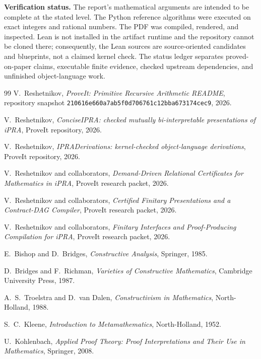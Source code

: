 \documentclass[11pt,oneside]{article}
\theoremstyle{remark}
\begin{document}
\vspace{0.4em}
\noindent\textbf{Verification status.}
The report's mathematical arguments are intended to be complete at the stated level.  The Python reference algorithms were executed on exact integers and rational numbers.  The PDF was compiled, rendered, and inspected.  Lean is not installed in the artifact runtime and the repository cannot be cloned there; consequently, the Lean sources are source-oriented candidates and blueprints, not a claimed kernel check.  The status ledger separates proved-on-paper claims, executable finite evidence, checked upstream dependencies, and unfinished object-language work.

\tableofcontents
\newpage
















\begin{thebibliography}{99}
V.~Reshetnikov, \emph{ProveIt: Primitive Recursive Arithmetic README}, repository snapshot \texttt{210616e660a7ab5f0d706761c12bba673174cec9}, 2026.

V.~Reshetnikov, \emph{ConciseIPRA: checked mutually bi-interpretable presentations of iPRA}, ProveIt repository, 2026.

V.~Reshetnikov, \emph{IPRADerivations: kernel-checked object-language derivations}, ProveIt repository, 2026.

V.~Reshetnikov and collaborators, \emph{Demand-Driven Relational Certificates for Mathematics in iPRA}, ProveIt research packet, 2026.

V.~Reshetnikov and collaborators, \emph{Certified Finitary Presentations and a Contract-DAG Compiler}, ProveIt research packet, 2026.

V.~Reshetnikov and collaborators, \emph{Finitary Interfaces and Proof-Producing Compilation for iPRA}, ProveIt research packet, 2026.

E.~Bishop and D.~Bridges, \emph{Constructive Analysis}, Springer, 1985.

D.~Bridges and F.~Richman, \emph{Varieties of Constructive Mathematics}, Cambridge University Press, 1987.

A.~S.~Troelstra and D.~van Dalen, \emph{Constructivism in Mathematics}, North-Holland, 1988.

S.~C.~Kleene, \emph{Introduction to Metamathematics}, North-Holland, 1952.

U.~Kohlenbach, \emph{Applied Proof Theory: Proof Interpretations and Their Use in Mathematics}, Springer, 2008.
\end{thebibliography}
\end{document}
